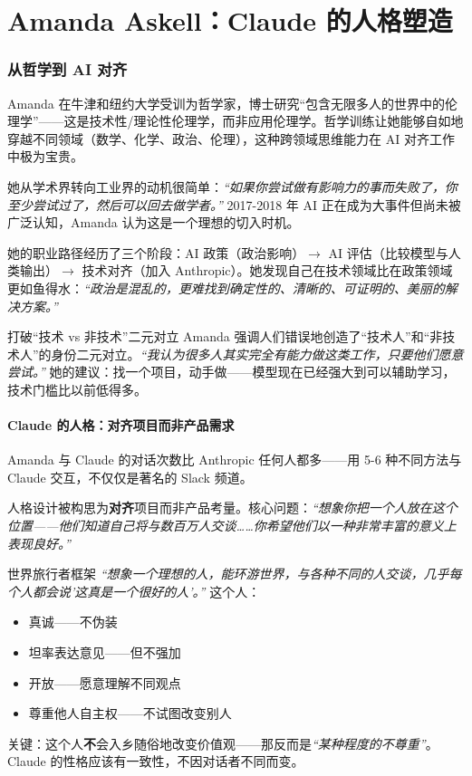 \documentclass[a4paper]{article}
\begin{document}
\part{Amanda Askell：Claude 的人格塑造}

\section{从哲学到 AI 对齐}

Amanda 在牛津和纽约大学受训为哲学家，博士研究``包含无限多人的世界中的伦理学''——这是技术性/理论性伦理学，而非应用伦理学。哲学训练让她能够自如地穿越不同领域（数学、化学、政治、伦理），这种跨领域思维能力在 AI 对齐工作中极为宝贵。

她从学术界转向工业界的动机很简单：\textit{``如果你尝试做有影响力的事而失败了，你至少尝试过了，然后可以回去做学者。''} 2017-2018 年 AI 正在成为大事件但尚未被广泛认知，Amanda 认为这是一个理想的切入时机。

她的职业路径经历了三个阶段：AI 政策（政治影响）$\to$ AI 评估（比较模型与人类输出）$\to$ 技术对齐（加入 Anthropic）。她发现自己在技术领域比在政策领域更如鱼得水：\textit{``政治是混乱的，更难找到确定性的、清晰的、可证明的、美丽的解决方案。''}

\begin{knowledgebox}{打破``技术 vs 非技术''二元对立}
Amanda 强调人们错误地创造了``技术人''和``非技术人''的身份二元对立。\textit{``我认为很多人其实完全有能力做这类工作，只要他们愿意尝试。''} 她的建议：找一个项目，动手做——模型现在已经强大到可以辅助学习，技术门槛比以前低得多。
\end{knowledgebox}

\subsection{Claude 的人格：对齐项目而非产品需求}

Amanda 与 Claude 的对话次数比 Anthropic 任何人都多——用 5-6 种不同方法与 Claude 交互，不仅仅是著名的 Slack 频道。

人格设计被构思为\textbf{对齐}项目而非产品考量。核心问题：\textit{``想象你把一个人放在这个位置——他们知道自己将与数百万人交谈……你希望他们以一种非常丰富的意义上表现良好。''}

\begin{importantbox}{世界旅行者框架}
\textit{``想象一个理想的人，能环游世界，与各种不同的人交谈，几乎每个人都会说'这真是一个很好的人'。''} 这个人：
\begin{itemize}
    \item 真诚——不伪装
    \item 坦率表达意见——但不强加
    \item 开放——愿意理解不同观点
    \item 尊重他人自主权——不试图改变别人
\end{itemize}

关键：这个人\textbf{不}会入乡随俗地改变价值观——那反而是\textit{``某种程度的不尊重''}。Claude 的性格应该有一致性，不因对话者不同而变。
\end{importantbox}
\end{document}
